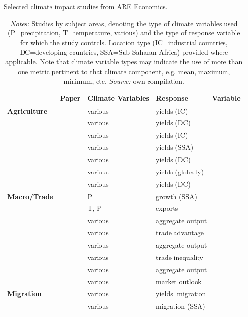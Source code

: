 \documentclass[a4paper,12pt]{article}
\theoremstyle{plain}
\theoremstyle{definition}
\theoremstyle{definition}
\theoremstyle{definition}
\theoremstyle{definition}
\begin{document}
\begin{table}[t!]
    \singlespacing
    \centering
    \caption{Selected climate impact studies from ARE Economics.}
    \caption*{\footnotesize{\textit{Notes:} Studies by subject areas, denoting the type of climate variables used (P=precipitation, T=temperature, various) and the type of response variable for which the study controls. Location type (IC=industrial countries, DC=developing countries, SSA=Sub-Saharan Africa) provided where applicable. Note that climate variable types may indicate the use of more than one metric pertinent to that climate component, e.g. mean, maximum, minimum, etc. \textit{Source:} own compilation.}}
    \begin{tabular}{|p{2.8cm}|p{6cm}|p{2.2cm}|p{3.5cm}| }
    \hline
    & \raggedright\textbf{Paper} & \textbf{Climate Variables} & \textbf{Response\ \ \ \ \ \ Variable} \\
    \hline    
    \textbf{Agriculture} & \citet{Deschenes2007} & various & yields (IC)\\
    \ \ & \citet{Mendelsohn2008} & various & yields (DC)\\
    \ \ & \citet{Schlenker2009} & various & yields (IC)\\
    \ \ & \citet{Schlenker2010} & various & yields (SSA)\\
    \ \ & \citet{Welch2010} & various & yields (DC)\\
    \ \ & \citet{Lobell2011}& various & yields (globally)\\
    \ \ & \citet{Hertel2014} & various & yields (DC)\\
    \hline
    \textbf{Macro/Trade} & \citet{Barrios2010} & P & growth (SSA)\\
    \ \ & \citet{Jones2010} & T, P & exports\\
    \ \ & \citet{Burke2015}& various & aggregate output\\
    \ \ & \citet{Costinot2016} & various & trade advantage\\
    \ \ & \citet{Deryugina2017}& various & aggregate output\\
    \ \ & \citet{Dingel2019} & various & trade inequality\\
    \ \ & \citet{Burke2019}& various & aggregate output\\
    \ \ & \citet{Schlenker2019} & various & market outlook\\
    \hline
    \textbf{Migration} & \citet{Feng2010}& various & yields, migration\\
    \ \ & \citet{Marchiori2012}& various & migration (SSA)\\

\end{tabular}
\end{table}
\end{document}
